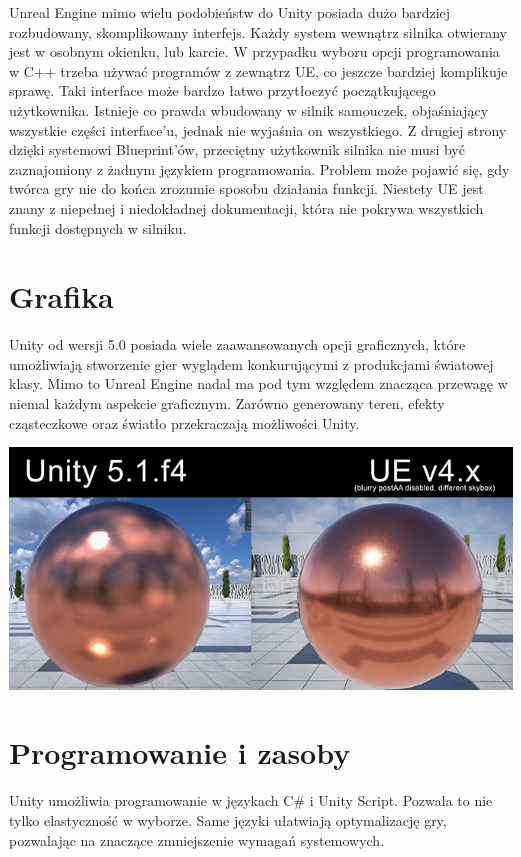 \documentclass[brudnopis]{xmgr}
\begin{document}
Unreal Engine mimo wielu podobieństw do Unity posiada dużo bardziej rozbudowany, skomplikowany interfejs. Każdy system wewnątrz silnika otwierany jest w osobnym okienku, lub karcie. W przypadku wyboru opcji programowania w C++ trzeba używać programów z zewnątrz UE, co jeszcze bardziej komplikuje sprawę. Taki interface może bardzo łatwo przytłoczyć początkującego użytkownika. Istnieje co prawda wbudowany w silnik samouczek, objaśniający wszystkie części interface’u, jednak nie wyjaśnia on wszystkiego.
Z drugiej strony dzięki systemowi Blueprint’ów, przeciętny użytkownik silnika nie musi być zaznajomiony z żadnym językiem programowania.
Problem może pojawić się, gdy twórca gry nie do końca zrozumie sposobu działania funkcji. Niestety UE jest znany z niepełnej i niedokładnej dokumentacji, która nie pokrywa wszystkich funkcji dostępnych w silniku.

\section{Grafika}

Unity od wersji 5.0 posiada wiele zaawansowanych opcji graficznych, które umożliwiają stworzenie gier wyglądem konkurującymi z produkcjami światowej klasy.
Mimo to Unreal Engine nadal ma pod tym względem znacząca przewagę w niemal każdym aspekcie graficznym. Zarówno generowany teren, efekty cząsteczkowe oraz światło przekraczają możliwości Unity.

\includegraphics[scale=0.5]{Screeny/UE_vs_Unity}

\section{Programowanie i zasoby}

Unity umożliwia programowanie w językach C\# i Unity Script. Pozwala to nie tylko elastyczność w wyborze. Same języki ułatwiają optymalizację gry, pozwalając na znaczące zmniejszenie wymagań systemowych.
\end{document}
